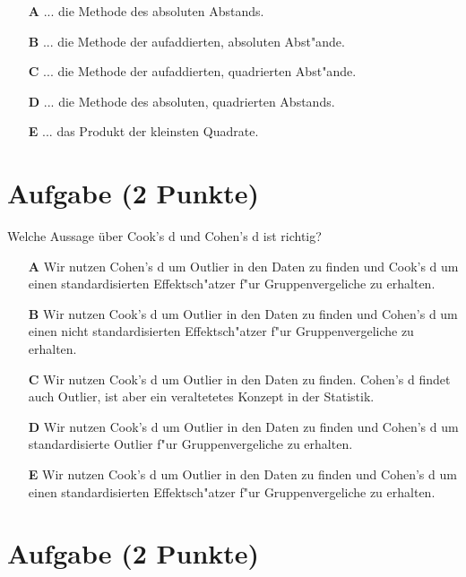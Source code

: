 \documentclass[a4paper, 10pt]{scrartcl}\usepackage[]{graphicx}\usepackage[]{xcolor}
\begin{document}
\begin{enumerate}
\item [\textbf{A} \msquare] ... die Methode des absoluten Abstands.
\item [\textbf{B} \msquare] ... die Methode der aufaddierten, absoluten Abst{"a}nde.
\item [\textbf{C} \msquare] ... die Methode der aufaddierten, quadrierten Abst{"a}nde.
\item [\textbf{D} \msquare] ... die Methode des absoluten, quadrierten Abstands.
\item [\textbf{E} \msquare] ... das Produkt der kleinsten Quadrate.
\end{enumerate} 

\section{Aufgabe \hfill (2 Punkte)}

Welche Aussage {\"u}ber Cook's d und Cohen's d ist richtig? 



\begin{enumerate}
\item [\textbf{A} \msquare] Wir nutzen Cohen's d um Outlier in den Daten zu finden und Cook's d um einen standardisierten Effektsch{"a}tzer f{"u}r Gruppenvergeliche zu erhalten.
\item [\textbf{B} \msquare] Wir nutzen Cook's d um Outlier in den Daten zu finden und Cohen's d um einen nicht standardisierten Effektsch{"a}tzer f{"u}r Gruppenvergeliche zu erhalten.
\item [\textbf{C} \msquare] Wir nutzen Cook's d um Outlier in den Daten zu finden. Cohen's d findet auch Outlier, ist aber ein veraltetetes Konzept in der Statistik.
\item [\textbf{D} \msquare] Wir nutzen Cook's d um Outlier in den Daten zu finden und Cohen's d um standardisierte Outlier f{"u}r Gruppenvergeliche zu erhalten.
\item [\textbf{E} \msquare] Wir nutzen Cook's d um Outlier in den Daten zu finden und Cohen's d um einen standardisierten Effektsch{"a}tzer f{"u}r Gruppenvergeliche zu erhalten.
\end{enumerate} 

\section{Aufgabe \hfill (2 Punkte)}
\end{document}
